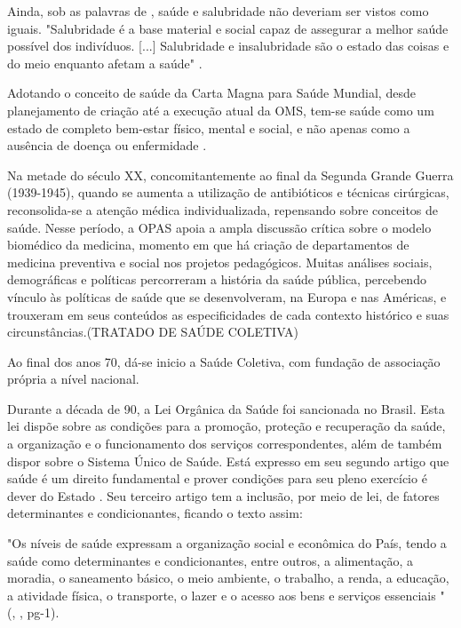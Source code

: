 \indent Ainda, sob as palavras de , saúde e salubridade não deveriam ser vistos como iguais. "Salubridade é a base material e social capaz de assegurar a melhor saúde possível dos indivíduos. [...] Salubridade e insalubridade são o estado das coisas e do meio enquanto afetam a saúde"  \cite{Foucault1990Microfisica}.

\indent Adotando o conceito de saúde da Carta Magna para Saúde Mundial, desde planejamento de criação até a execução atual da \acrfull{OMS}, tem-se saúde como um estado de completo bem-estar físico, mental e social, e não apenas como a ausência de doença ou enfermidade \cite{OMS2024S1, ParranHEALTH}.

\indent  Na metade do século XX, concomitantemente ao final da Segunda Grande Guerra (1939-1945), quando se aumenta a utilização de antibióticos e técnicas cirúrgicas, reconsolida-se a atenção médica individualizada, repensando sobre conceitos de saúde. Nesse período, a \acrfull{OPAS} apoia a ampla discussão crítica sobre o modelo biomédico da medicina, momento em que há criação de departamentos de medicina preventiva e social nos projetos pedagógicos. Muitas análises sociais, demográficas e políticas percorreram a história da saúde pública, percebendo vínculo às políticas de saúde que se desenvolveram, na Europa e nas Américas, e trouxeram em seus conteúdos as especificidades de cada contexto histórico e suas circunstâncias.(TRATADO DE SAÚDE COLETIVA)

\indent Ao final dos anos 70, dá-se inicio a Saúde Coletiva, com fundação de associação própria a nível nacional.

\indent Durante a década de 90, a Lei Orgânica da Saúde foi sancionada no Brasil. Esta lei dispõe sobre as condições  para a promoção, proteção  e  recuperação  da  saúde,  a  organização  e  o  funcionamento  dos  serviços correspondentes, além de também dispor sobre o Sistema Único de Saúde. Está expresso em seu segundo artigo que saúde é um direito fundamental e prover condições para seu pleno exercício é dever do Estado \cite{BRASIL1990LeiSUS}. Seu terceiro artigo tem a inclusão, por meio de lei, de fatores determinantes e condicionantes, ficando o texto assim:

\begin{citacao}
"Os níveis de saúde expressam a organização social e econômica do País, tendo a saúde como determinantes e condicionantes, entre outros, a alimentação, a moradia, o saneamento básico, o meio ambiente, o trabalho, a renda, a educação, a atividade física, o transporte, o lazer e o acesso aos bens e serviços essenciais "
(\citeauthor{BRASIL2013LeiDeterminantesCondicionantesSaude}, \citeyear{BRASIL2013LeiDeterminantesCondicionantesSaude}, pg-1).
\end{citacao}

